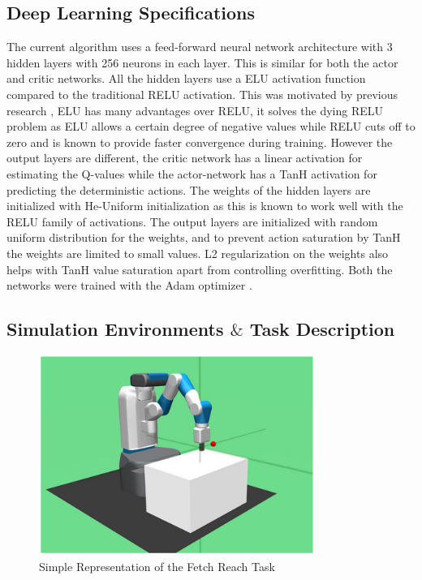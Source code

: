 \subsection{Deep Learning Specifications}

The current algorithm uses a feed-forward neural network architecture with 3 hidden layers with 256 neurons in each layer. This is similar for both the actor and critic networks. All the hidden layers use a ELU \cite{clevert2016fast} activation function compared to the traditional RELU \cite{agarap2018deep} activation. This was motivated by previous research \cite{goecks2020integrating}, ELU has many advantages over RELU, it solves the dying RELU problem as ELU allows a certain degree of negative values while RELU cuts off to zero and is known to provide faster convergence during training. However the output layers are different, the critic network has a linear activation for estimating the Q-values while the actor-network has a TanH \cite{tanh} activation for predicting the deterministic actions. The weights of the hidden layers are initialized with He-Uniform \cite{he2015delving} initialization as this is known to work well with the RELU family of activations. The output layers are initialized with random uniform distribution for the weights, and to prevent action saturation by TanH the weights are limited to small values. L2 regularization on the weights also helps with TanH value saturation apart from controlling overfitting. Both the networks were trained with the Adam optimizer \cite{kingma2017adam}. \\

\subsection{Simulation Environments $\&$ Task Description}

\begin{figure}[h!]
    \centering
    \includegraphics[width=0.8\textwidth]{images/FR.png}
    \caption{Simple Representation of the Fetch Reach Task}
    \label{fig:FR}
\end{figure}


